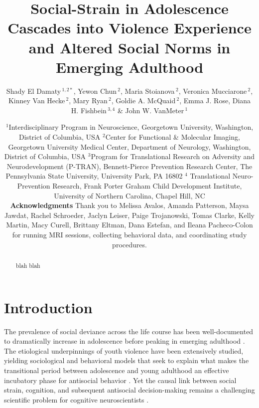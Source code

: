 \documentclass[utf8]{article}
\title{Social-Strain in Adolescence Cascades into Violence Experience and Altered Social Norms in Emerging Adulthood}
\author{
\parbox{\linewidth}{\centering
Shady El Damaty\,$^{1,2*}$, Yewon Chun\,$^{2}$, Maria Stoianova\,$^{2}$, Veronica Mucciarone\,$^{2}$,  Kinney Van Hecke\,$^{2}$, Mary Ryan\,$^{2}$, Goldie A. McQuaid\,$^{2}$, Emma J. Rose, Diana H. Fishbein\,$^{3,4}$ \& John W. VanMeter\,$^{1}$}
}
\date{\footnotesize{$^{1}$Interdisciplinary Program in Neuroscience, Georgetown University, Washington, District of Columbia, USA
$^{2}$Center for Functional \& Molecular Imaging, Georgetown University Medical Center, Department of Neurology, Washington, District of Columbia, USA
$^{3}$Program for Translational Research on Adversity and Neurodevelopment (P-TRAN), Bennett-Pierce Prevention Research Center, The Pennsylvania State University, University Park, PA 16802
$^{4}$ Translational Neuro-Prevention Research, Frank Porter Graham Child Development Institute, University of Northern Carolina, Chapel Hill, NC} \\  \vspace{5pt} \textbf{Acknowledgments}
Thank you to Melissa Avalos, Amanda Patterson, Maysa Jawdat, Rachel Schroeder, Jaclyn Leiser, Paige Trojanowski, Tomas Clarke, Kelly Martin, Macy Curell, Brittany Eltman, Dana Estefan, and Ileana Pacheco-Colon for running MRI sessions, collecting behavioral data, and coordinating study procedures. }
\begin{document}
\maketitle
\begin{abstract}
blah blah
\end{abstract}
\section*{Introduction}
The prevalence of social deviance across the life course has been well-documented to dramatically increase in adolescence before peaking in emerging adulthood \citep{loeber2011young,farrington1986age,maguire2004sourcebook,finkelhor2009children}. The etiological underpinnings of youth violence have been extensively studied, yielding sociological and behavioral models that seek to explain what makes the transitional period between adolescence and young adulthood an effective incubatory phase for antisocial behavior \citep{LunaWright2016,dahl2004adolescent}. Yet the causal link between social strain, cognition, and subsequent antisocial decision-making remains a challenging scientific problem for cognitive neuroscientists \citep{meisel2019mind,poldrack2018predicting}.
\end{document}
